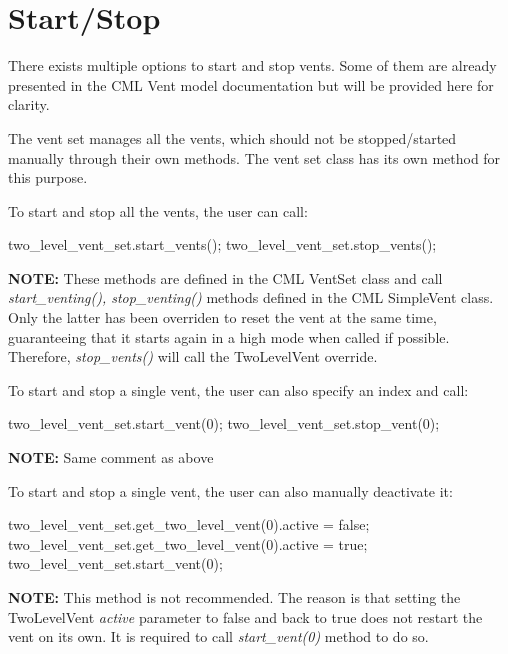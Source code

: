 \documentclass[11pt,fleqn]{report}
\begin{document}
\section{Start/Stop}
\noindent There exists multiple options to start and stop vents. Some of them are already presented in the CML Vent model 
documentation but will be provided here for clarity.

\noindent The vent set manages all the vents, which should not be stopped/started manually through their own methods.
The vent set class has its own method for this purpose.

\noindent To start and stop all the vents, the user can call:
\begin{codeC}
    two_level_vent_set.start_vents();
    two_level_vent_set.stop_vents();
\end{codeC}

\begin{tcolorbox}[colback=lightgray, boxrule=0pt, sharp corners]
\textbf{NOTE:} These methods are defined in the CML VentSet class and call \emph{start\_venting(), stop\_venting()} methods
defined in the CML SimpleVent class. Only the latter has been overriden to reset the vent at the same time, guaranteeing that 
it starts again in a high mode when called if possible. Therefore, \emph{stop\_vents()} will call the TwoLevelVent override.
\end{tcolorbox}

\noindent To start and stop a single vent, the user can also specify an index and call:
\begin{codeC}
    two_level_vent_set.start_vent(0);
    two_level_vent_set.stop_vent(0);
\end{codeC}

\begin{tcolorbox}[colback=lightgray, boxrule=0pt, sharp corners]
\textbf{NOTE:} Same comment as above
\end{tcolorbox}

\noindent To start and stop a single vent, the user can also manually deactivate it:
\begin{codeC}
    two_level_vent_set.get_two_level_vent(0).active = false;
    two_level_vent_set.get_two_level_vent(0).active = true;
    two_level_vent_set.start_vent(0);
\end{codeC}

\begin{tcolorbox}[colback=lightgray, boxrule=0pt, sharp corners]
\textbf{NOTE:} This method is not recommended. The reason is that setting the TwoLevelVent \emph{active} parameter to false 
and back to true does not restart the vent on its own. It is required to call \emph{start\_vent(0)} method to do so. 
\end{tcolorbox}
\end{document}
